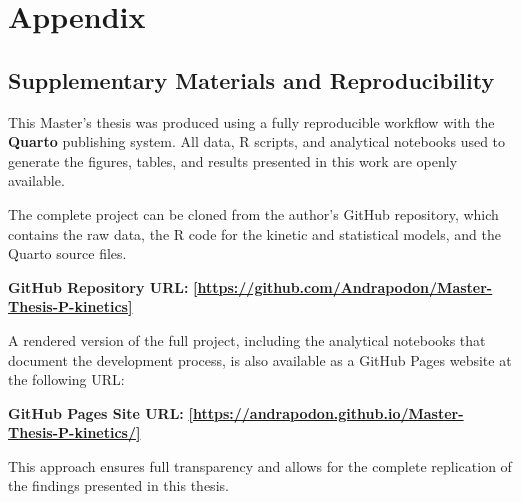 \documentclass[
  a4paper,
]{article}
\begin{document}
\newpage

\section{Appendix}\label{appendix}

\subsection{Supplementary Materials and
Reproducibility}\label{supplementary-materials-and-reproducibility}

This Master's thesis was produced using a fully reproducible workflow
with the \textbf{Quarto} publishing system. All data, R scripts, and
analytical notebooks used to generate the figures, tables, and results
presented in this work are openly available.

The complete project can be cloned from the author's GitHub repository,
which contains the raw data, the R code for the kinetic and statistical
models, and the Quarto source files.

\textbf{GitHub Repository URL:}
\href{https://github.com/Andrapodon/Master-Thesis-P-kinetics}{\textbf{{[}https://github.com/Andrapodon/Master-Thesis-P-kinetics{]}}}

A rendered version of the full project, including the analytical
notebooks that document the development process, is also available as a
GitHub Pages website at the following URL:

\textbf{GitHub Pages Site URL:}
\href{https://andrapodon.github.io/Master-Thesis-P-kinetics/}{\textbf{{[}https://andrapodon.github.io/Master-Thesis-P-kinetics/{]}}}

This approach ensures full transparency and allows for the complete
replication of the findings presented in this thesis.




\end{document}
